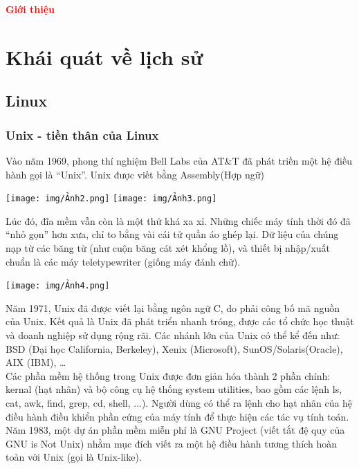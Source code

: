 \documentclass[12pt,a4paper]{article}
\begin{document}
\tableofcontents
\newpage
{}
\begin{center}
	{\fontsize{30}{14}\selectfont \textbf{\textcolor{red}{Giới thiệu}}}
\end{center}

\section{Khái quát về lịch sử}
\subsection{Linux}
\subsubsection{Unix - tiền thân của Linux}
Vào năm 1969, phong thí nghiệm Bell Labs của AT\&T đã phát triền một hệ điều hành gọi là “Unix”. Unix được viết bằng Assembly(Hợp ngữ)
\begin{center}
	\texttt{[image: img/Ảnh2.png]}
	\texttt{[image: img/Ảnh3.png]}
\end{center}
Lúc đó, đĩa mềm vẫn còn là một thứ khá xa xỉ. Những chiếc máy tính thời đó đã “nhỏ gọn” hơn xưa, chỉ to bằng vài cái tử quần áo ghép lại. Dữ liệu của chúng nạp từ các băng từ (như cuộn băng cát xét khổng lồ), và thiết bị nhập/xuất chuẩn là các máy teletypewriter (giống máy đánh chữ).
\begin{center}
	\texttt{[image: img/Ảnh4.png]}
\end{center}
Năm 1971, Unix đã được viết lại bằng ngôn ngữ C, do phải công bố mã nguồn của Unix. Kết quả là Unix đã phát triển nhanh tróng, được các tổ chức học thuật và doanh nghiệp sử dụng rộng rãi. Các nhánh lớn của Unix có thể kể đến như: BSD (Đại học California, Berkeley), Xenix (Microsoft), SunOS/Solaris(Oracle), AIX (IBM), …\\

Các phần mềm hệ thống trong Unix được đơn giản hóa thành 2 phần chính: kernal (hạt nhân) và bộ công cụ hệ thống system utilities, bao gồm các lệnh ls, cat, awk, find, grep, cd, shell, ...). Người dùng có thể ra lệnh cho hạt nhân của hệ điều hành điều khiển phần cứng của máy tính để thực hiện các tác vụ tính toán.\\

Năm 1983, một dự án phần mềm miễn phí là GNU Project (viết tắt đệ quy của GNU is Not Unix) nhằm mục đích viết ra một hệ điều hành tương thích hoàn toàn với Unix (gọi là Unix-like).\\
\end{document}
